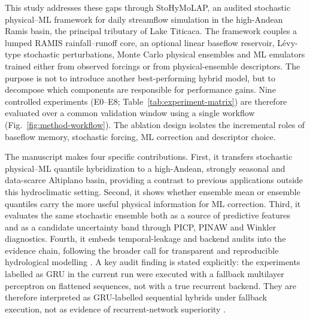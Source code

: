 This study addresses these gaps through StoHyMoLAP, an audited
stochastic physical--ML framework for daily streamflow simulation in the
high-Andean Ramis basin, the principal tributary of Lake Titicaca. The
framework couples a lumped RAMIS rainfall--runoff core, an optional
linear baseflow reservoir, L\'{e}vy-type stochastic perturbations,
Monte Carlo physical ensembles and ML emulators trained either from
observed forcings or from physical-ensemble descriptors. The purpose is
not to introduce another best-performing hybrid model, but to decompose
which components are responsible for performance gains. Nine controlled
experiments (E0--E8; Table~\ref{tab:experiment-matrix}) are therefore
evaluated over a common validation window using a single workflow
(Fig.~\ref{fig:method-workflow}). The ablation design isolates the
incremental roles of baseflow memory, stochastic forcing, ML correction
and descriptor choice.

The manuscript makes four specific contributions. First, it transfers
stochastic physical--ML quantile hybridization to a high-Andean,
strongly seasonal and data-scarce Altiplano basin, providing a contrast
to previous applications outside this hydroclimatic setting. Second, it
shows whether ensemble mean or ensemble quantiles carry the more useful
physical information for ML correction. Third, it evaluates the same
stochastic ensemble both as a source of predictive features and as a
candidate uncertainty band through PICP, PINAW and Winkler diagnostics.
Fourth, it embeds temporal-leakage and backend audits into the evidence
chain, following the broader call for transparent and reproducible
hydrological modelling \citep{hall2021hydrologist}. A key audit finding
is stated explicitly: the experiments labelled as GRU in the current
run were executed with a fallback multilayer perceptron on flattened
sequences, not with a true recurrent backend. They are therefore
interpreted as GRU-labelled sequential hybrids under fallback execution,
not as evidence of recurrent-network superiority
\citep{kratzert2018rainfall}.

